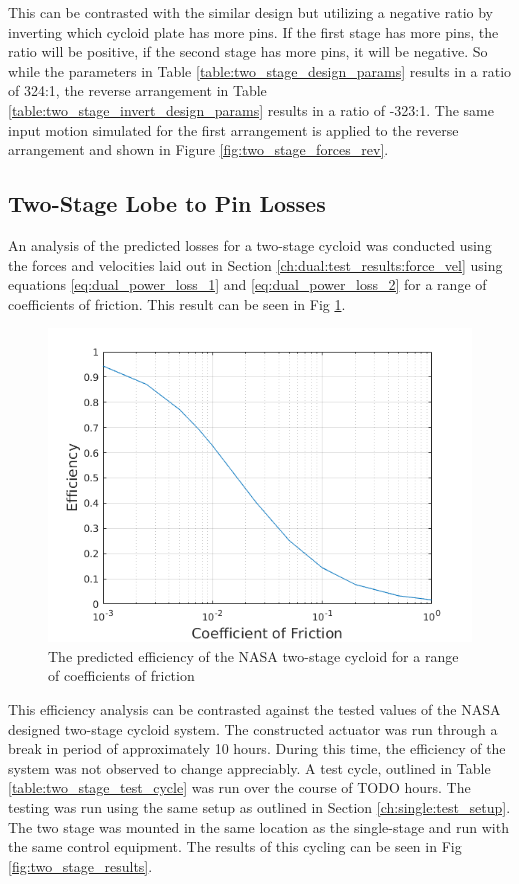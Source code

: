 This can be contrasted with the similar design but utilizing a negative ratio by inverting which cycloid plate has more pins. If the first stage has more pins, the ratio will be positive, if the second stage has more pins, it will be negative. So while the parameters in Table \ref{table:two_stage_design_params} results in a ratio of 324:1, the reverse arrangement in Table \ref{table:two_stage_invert_design_params} results in a ratio of -323:1. The same input motion simulated for the first arrangement is applied to the reverse arrangement and shown in Figure \ref{fig:two_stage_forces_rev}.

\subsection{Two-Stage Lobe to Pin Losses} \label{ch:dual:test_results:losses}

An analysis of the predicted losses for a two-stage cycloid was conducted using the forces and velocities laid out in Section \ref{ch:dual:test_results:force_vel} using equations \ref{eq:dual_power_loss_1} and \ref{eq:dual_power_loss_2} for a range of coefficients of friction. This result can be seen in Fig \ref{fig:two_stage_as_designed}.

\begin{figure}[h]
	\centering
	\includegraphics[width=0.75\linewidth]{fig/two_stage_as_designed}
   \caption{The predicted efficiency of the NASA two-stage cycloid for a range of coefficients of friction}
   \label{fig:two_stage_as_designed}
\end{figure}

This efficiency analysis can be contrasted against the tested values of the NASA designed two-stage cycloid system. The constructed actuator was run through a break in period of approximately 10 hours. During this time, the efficiency of the system was not observed to change appreciably. A test cycle, outlined in Table \ref{table:two_stage_test_cycle} was run over the course of TODO hours. The testing was run using the same setup as outlined in Section \ref{ch:single:test_setup}. The two stage was mounted in the same location as the single-stage and run with the same control equipment. The results of this cycling can be seen in Fig \ref{fig:two_stage_results}.

